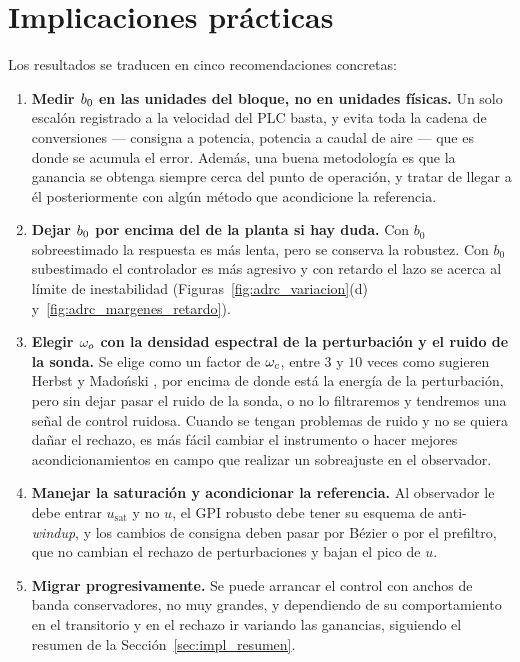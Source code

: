 \section{Implicaciones prácticas}
\label{sec:implicaciones}


Los resultados se traducen en cinco recomendaciones concretas:

\begin{enumerate}
  \item \textbf{Medir $b_{0}$ en las unidades del bloque, no en unidades
  físicas.} Un solo escalón registrado a la velocidad del PLC basta, y evita
  toda la cadena de conversiones --- consigna a potencia, potencia a caudal de
  aire --- que es donde se acumula el error. Además, una buena metodología es que la ganancia se obtenga
  siempre cerca del punto de operación, y tratar de llegar a él posteriormente con
  algún método que acondicione la referencia.

  \item \textbf{Dejar $b_{0}$ por encima del de la planta si hay duda.} Con $b_0$ sobreestimado la
  respuesta es más lenta, pero se conserva la robustez. Con $b_0$ subestimado el controlador es más
  agresivo y con retardo el lazo se acerca al límite de inestabilidad (Figuras~\ref{fig:adrc_variacion}(d)
  y~\ref{fig:adrc_margenes_retardo}).

  \item \textbf{Elegir $\omega_{o}$ con la densidad espectral de la perturbación y el ruido de la sonda.} Se elige como
  un factor de $\omega_{c}$, entre $3$ y $10$ veces como sugieren Herbst y Madoński
  \cite[sec.~3.3]{herbst2024adrc}, por encima de donde está la energía de la perturbación, pero sin
  dejar pasar el ruido de la sonda, o no lo filtraremos y tendremos una señal de control ruidosa. Cuando
  se tengan problemas de ruido y no se quiera dañar el rechazo, es más fácil cambiar el
  instrumento o hacer mejores acondicionamientos en campo que realizar un sobreajuste en el observador.

  \item \textbf{Manejar la saturación y acondicionar la referencia.} Al observador le debe entrar
  $u_{\mathrm{sat}}$ y no $u$, el GPI robusto debe tener su esquema de anti-\emph{windup}, y los cambios de
  consigna deben pasar por Bézier o por el prefiltro, que no cambian el rechazo de perturbaciones y
  bajan el pico de $u$.

  \item \textbf{Migrar progresivamente.} Se puede arrancar el control con anchos de banda
  conservadores, no muy grandes, y dependiendo de su comportamiento en el transitorio y en el rechazo ir
  variando las ganancias, siguiendo el resumen de la Sección~\ref{sec:impl_resumen}.
\end{enumerate}
